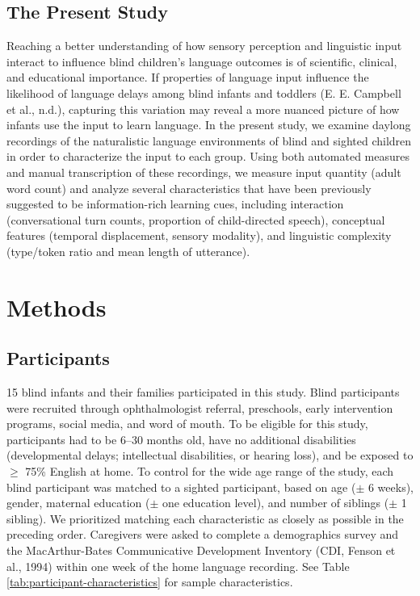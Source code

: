 \documentclass[
  man]{apa6}
\begin{document}
\hypertarget{the-present-study}{%
\subsection{The Present Study}\label{the-present-study}}

Reaching a better understanding of how sensory perception and linguistic input interact to influence blind children's language outcomes is of scientific, clinical, and educational importance. If properties of language input influence the likelihood of language delays among blind infants and toddlers (E. E. Campbell et al., n.d.), capturing this variation may reveal a more nuanced picture of how infants use the input to learn language. In the present study, we examine daylong recordings of the naturalistic language environments of blind and sighted children in order to characterize the input to each group. Using both automated measures and manual transcription of these recordings, we measure input quantity (adult word count) and analyze several characteristics that have been previously suggested to be information-rich learning cues, including interaction (conversational turn counts, proportion of child-directed speech), conceptual features (temporal displacement, sensory modality), and linguistic complexity (type/token ratio and mean length of utterance).

\hypertarget{methods}{%
\section{Methods}\label{methods}}

\hypertarget{participants}{%
\subsection{Participants}\label{participants}}

15 blind infants and their families participated in this study. Blind participants were recruited through ophthalmologist referral, preschools, early intervention programs, social media, and word of mouth. To be eligible for this study, participants had to be 6--30 months old, have no additional disabilities (developmental delays; intellectual disabilities, or hearing loss), and be exposed to \(\geq\) 75\% English at home. To control for the wide age range of the study, each blind participant was matched to a sighted participant, based on age (\(\pm\) 6 weeks), gender, maternal education (\(\pm\) one education level), and number of siblings (\(\pm\) 1 sibling). We prioritized matching each characteristic as closely as possible in the preceding order. Caregivers were asked to complete a demographics survey and the MacArthur-Bates Communicative Development Inventory (CDI, Fenson et al., 1994) within one week of the home language recording. See Table \ref{tab:participant-characteristics} for sample characteristics.
\end{document}
